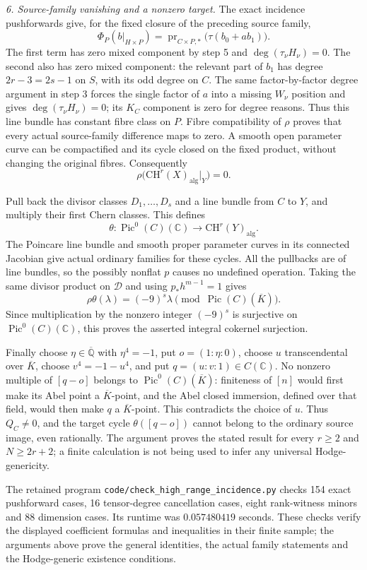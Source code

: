 \emph{6. Source-family vanishing and a nonzero target.}
The exact incidence pushforwards give, for the fixed closure
of the preceding source family,
\[
 \Phi_P(b|_{H\times P})
   =\operatorname{pr}_{C\times P,*}\bigl(\tau(b_0+a b_1)\bigr).
\]
The first term has zero mixed component by step 5 and
$\deg(\tau_\nu H_\nu)=0$. The second also has zero mixed
component: the relevant part of $b_1$ has degree
$2r-3=2s-1$ on $S$, with its odd degree on $C$.
The same factor-by-factor degree argument in step 3
forces the single factor of $a$ into a missing $W_\nu$
position and gives $\deg(\tau_\nu H_\nu)=0$; its
$K_C$ component is zero for degree reasons.
Thus this line bundle has constant fibre class on $P$.
Fibre compatibility of $\rho$ proves that every actual
source-family difference maps to zero. A smooth open
parameter curve can be compactified and its cycle closed
on the fixed product, without changing the original
fibres. Consequently
\[
 \rho\bigl(\mathrm{CH}^r(X)_{\mathrm{alg}}|_Y\bigr)=0.
\]

Pull back the divisor classes $D_1,\ldots,D_s$ and a
line bundle from $C$ to $Y$, and multiply their first
Chern classes. This defines
\[
 \theta:\operatorname{Pic}^0(C)(\mathbb C)
          \longrightarrow\mathrm{CH}^r(Y)_{\mathrm{alg}}.
\]
The Poincare line bundle and smooth proper parameter
curves in its connected Jacobian give actual ordinary
families for these cycles. All the pullbacks are of
line bundles, so the possibly nonflat $p$ causes no
undefined operation. Taking the same divisor product
on $\mathcal D$ and using $p_*h^{m-1}=1$ gives
\[
 \rho\theta(\lambda)=(-9)^s\lambda\pmod{
                                      \operatorname{Pic}(C)(\overline K)}.
\]
Since multiplication by the nonzero integer $(-9)^s$
is surjective on $\operatorname{Pic}^0(C)(\mathbb C)$,
this proves the asserted integral cokernel surjection.

Finally choose $\eta\in\overline{\mathbb Q}$ with
$\eta^4=-1$, put $o=(1:\eta:0)$, choose $u$
transcendental over $\overline K$, choose
$v^4=-1-u^4$, and put $q=(u:v:1)\in C(\mathbb C)$.
No nonzero multiple of $[q-o]$ belongs to
$\operatorname{Pic}^0(C)(\overline K)$: finiteness of
$[n]$ would first make its Abel point a $\overline K$-point,
and the Abel closed immersion, defined over that field,
would then make $q$ a $\overline K$-point. This contradicts
the choice of $u$. Thus $Q_C\ne0$, and the target cycle
$\theta([q-o])$ cannot belong to the ordinary source image,
even rationally. The argument proves the stated result
for every $r\ge2$ and $N\ge2r+2$; a finite calculation
is not being used to infer any universal Hodge-genericity.

The retained program
\texttt{code/check\_high\_range\_incidence.py} checks 154
exact pushforward cases, 16 tensor-degree cancellation cases,
eight rank-witness minors and 88 dimension cases. Its runtime
was $0.057480419$ seconds. These checks verify the displayed
coefficient formulas and inequalities in their finite sample;
the arguments above prove the general identities, the actual
family statements and the Hodge-generic existence conditions.
